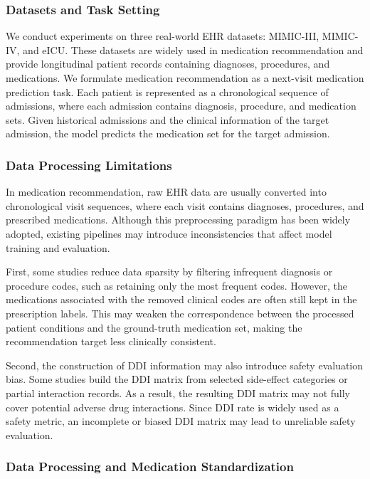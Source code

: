 \documentclass[manuscript,review]{acmart}
\begin{document}
\subsubsection{Datasets and Task Setting}

We conduct experiments on three real-world EHR datasets: MIMIC-III, MIMIC-IV, and eICU. These datasets are widely used in medication recommendation and provide longitudinal patient records containing diagnoses, procedures, and medications. We formulate medication recommendation as a next-visit medication prediction task. Each patient is represented as a chronological sequence of admissions, where each admission contains diagnosis, procedure, and medication sets. Given historical admissions and the clinical information of the target admission, the model predicts the medication set for the target admission.

\subsubsection{Data Processing Limitations}

In medication recommendation, raw EHR data are usually converted into chronological visit sequences, where each visit contains diagnoses, procedures, and prescribed medications. Although this preprocessing paradigm has been widely adopted, existing pipelines may introduce inconsistencies that affect model training and evaluation.

First, some studies reduce data sparsity by filtering infrequent diagnosis or procedure codes, such as retaining only the most frequent codes. However, the medications associated with the removed clinical codes are often still kept in the prescription labels. This may weaken the correspondence between the processed patient conditions and the ground-truth medication set, making the recommendation target less clinically consistent.

Second, the construction of DDI information may also introduce safety evaluation bias. Some studies build the DDI matrix from selected side-effect categories or partial interaction records. As a result, the resulting DDI matrix may not fully cover potential adverse drug interactions. Since DDI rate is widely used as a safety metric, an incomplete or biased DDI matrix may lead to unreliable safety evaluation.

\subsubsection{Data Processing and Medication Standardization}
\label{sec:dataset_settings}
\end{document}
